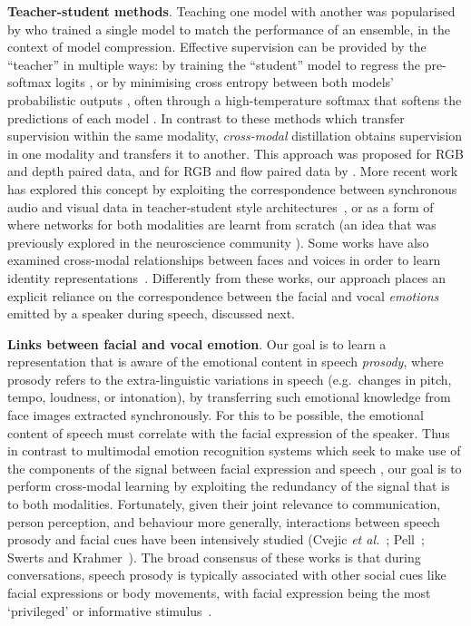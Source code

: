 \documentclass[sigconf]{acmart}
\begin{document}
\textbf{Teacher-student methods}.
Teaching one model with another was popularised by
\cite{bucilua2006model} who trained a single model to match the
performance of an ensemble, in the context of model
compression. Effective supervision can be provided by the ``teacher''
in multiple ways: by training the ``student'' model to regress the
pre-softmax logits \cite{ba2014deep}, or by minimising cross entropy
between both models' probabilistic outputs \cite{li2014learning},
often through a high-temperature softmax that softens the predictions
of each model \cite{hinton2015distilling,crowley2017moonshine}. In
contrast to these methods which transfer supervision within the same
modality, \textit{cross-modal} distillation obtains supervision in one
modality and transfers it to another.  This approach was proposed for
RGB and depth paired data, and for RGB and flow paired data by
\cite{gupta2016cross}.  
More recent
work~\cite{aytar2016soundnet,arandjelovic2017look,aytar2017see,owens2016ambient}
has explored this concept by exploiting the correspondence between
synchronous audio and visual data in teacher-student style
architectures~\cite{aytar2016soundnet,aytar2017see}, or as a form of
~\cite{arandjelovic2017look} where networks for
both modalities are learnt from scratch (an idea that was previously explored in the neuroscience community \cite{barlow1989unsupervised}).   Some works have also
examined cross-modal relationships between faces and voices in order
to learn identity
representations~\cite{Nagrani18a,nagrani2018learnable,kim2018learning}. Differently
from these works, our approach places an explicit reliance on the
correspondence between the facial and vocal {\em emotions} emitted by
a speaker during speech, discussed next.

\noindent \textbf{Links between facial and vocal emotion}. 
Our goal is to learn a representation that is aware of the emotional
content in speech \textit{prosody}, where prosody refers to the
extra-linguistic variations in speech (e.g.\ changes in pitch, tempo,
loudness, or intonation), by transferring such emotional knowledge
from face images extracted synchronously. For this to be possible, the
emotional content of speech must correlate with the facial expression
of the speaker. Thus in contrast to multimodal emotion recognition
systems which seek to make use of the  components
of the signal between facial expression and speech
\cite{busso2004analysis}, our goal is to perform cross-modal learning
by exploiting the redundancy of the signal that is  to
both modalities.  Fortunately, given their joint relevance to
communication, person perception, and behaviour more generally,
interactions between speech prosody and facial cues have been
intensively studied (Cvejic {\it et al.}~\cite{cvejic2010prosody};
Pell~\cite{pell2005prosody}; Swerts and Krahmer~\cite{swerts2008facial}).  The broad consensus of these works is
that during conversations, speech prosody is typically associated with
other social cues like facial expressions or body movements, with
facial expression being the most `privileged' or informative
stimulus~\cite{rigoulot2014emotion}.
\end{document}
